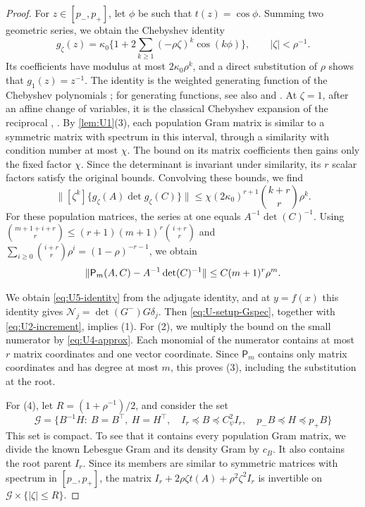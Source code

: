 \begin{proof}
For $z\in[p_-,p_+]$, let $\phi$ be such that $t(z)=\cos\phi$.
Summing two geometric series, we obtain the Chebyshev identity
\[
 g_\zeta(z)=\kappa_0\{1+2\sum_{k\ge1}(-\rho\zeta)^k\cos(k\phi)\},
 \qquad |\zeta|<\rho^{-1}.
\]
Its coefficients have modulus at most $2\kappa_0\rho^k$, and a direct
substitution of $\rho$ shows that $g_1(z)=z^{-1}$.
The identity is the weighted generating function of the Chebyshev
polynomials \cite[Eq.~18.12.7]{DLMF}; for generating functions, see also
\cite[Section~5.2.1]{MasonHandscomb2003} and
\cite[Section~1.5]{Rivlin1990}. At $\zeta=1$, after an affine change of
variables, it is the classical Chebyshev expansion of the reciprocal
\cite[equation~(5.14)]{MasonHandscomb2003},
\cite[equation~(2.4)]{Mathar2006}.
By \cref{lem:U1}(3), each population Gram matrix is similar to a
symmetric matrix with spectrum in this interval, through a similarity
with condition number at most $\chi$. The bound on its matrix
coefficients then gains only the fixed factor $\chi$.
Since the determinant is invariant under similarity, its $r$ scalar
factors satisfy the original bounds. Convolving these bounds, we find
\[
 \|[\zeta^k]\{g_\zeta(A)\det g_\zeta(C)\}\|
 \le\chi(2\kappa_0)^{r+1}\binom{k+r}{r}\rho^k.
\]
For these population matrices, the series at one equals
$A^{-1}\det(C)^{-1}$. Using
$\binom{m+1+i+r}{r}\le(r+1)(m+1)^r\binom{i+r}{r}$ and
$\sum_{i\ge0}\binom{i+r}{r}\rho^i=(1-\rho)^{-r-1}$, we obtain
\begin{equation}\label{eq:U4-approx}
 \lVert\mathsf P_m(A,C)-A^{-1}\det(C)^{-1}\rVert
 \le C(m+1)^r\rho^m.
\end{equation}

We obtain \eqref{eq:U5-identity} from the adjugate identity, and at
$y=f(x)$ this identity gives $\mathcal N_j=\det(G^-)G\delta_j$.
Then \eqref{eq:U-setup-Gspec}, together with \eqref{eq:U2-increment},
implies (1).
For (2), we multiply the bound on the small numerator by
\eqref{eq:U4-approx}. Each monomial of the numerator contains at most $r$
matrix coordinates and one vector coordinate. Since $\mathsf P_m$
contains only matrix coordinates and has degree at most $m$, this
proves (3), including the substitution at the root.

For (4), let $R=(1+\rho^{-1})/2$, and consider the set
\[
 \mathcal G=\{B^{-1}H:\ B=B^\top,\ H=H^\top,\quad
 I_r\preceq B\preceq C_\psi^2I_r,\quad
 p_-B\preceq H\preceq p_+B\}
\]
This set is compact. To see that it contains every population Gram
matrix, we divide the known Lebesgue Gram and its density Gram by
$c_B$. It also contains the root parent $I_r$. Since its members are
similar to symmetric matrices with spectrum in $[p_-,p_+]$, the matrix
$I_r+2\rho\zeta t(A)+\rho^2\zeta^2I_r$ is invertible on
$\mathcal G\times\{|\zeta|\le R\}$.


\end{proof}
